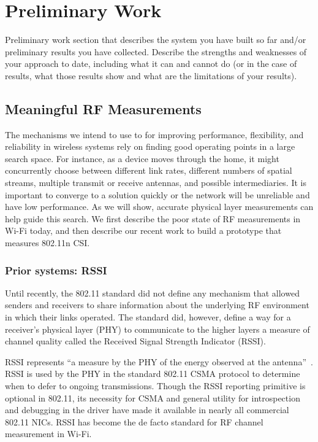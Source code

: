\section{Preliminary Work}
\label{sec:preliminary}
Preliminary work section that describes the system you have built so
far and/or preliminary results you have collected. Describe the
strengths and weaknesses of your approach to date, including what it can
and cannot do (or in the case of results, what those results show and
what are the limitations of your results).

\subsection{Meaningful RF Measurements}
The mechanisms we intend to use to for improving performance, flexibility, and reliability in wireless systems rely on finding good operating points in a large search space. For instance, as a device moves through the home, it might concurrently choose between different link rates, different numbers of spatial streams, multiple transmit or receive antennas, and possible intermediaries. It is important to converge to a solution quickly or the network will be unreliable and have low performance. As we will show, accurate physical layer measurements can help guide this search. We first describe the poor state of RF measurements in Wi-Fi today, and then describe our recent work to build a prototype that measures 802.11n CSI.

\subsubsection{Prior systems: RSSI}
Until recently, the 802.11 standard did not define any mechanism that allowed senders and receivers to share information about the underlying RF environment in which their links operated. The standard did, however, define a way for a receiver's physical layer (PHY) to communicate to the higher layers a measure of channel quality called the Received Signal Strength Indicator (RSSI).

RSSI represents ``a measure by the PHY of the energy observed at the antenna''~\cite[\S14.2.3.2]{80211}. RSSI is used by the PHY in the standard 802.11 CSMA protocol to determine when to defer to ongoing transmissions. Though the RSSI reporting primitive is optional in 802.11, its necessity for CSMA and general utility for introspection and debugging in the driver have made it available in nearly all commercial 802.11 NICs. RSSI has become the de facto standard for RF channel measurement in Wi-Fi.


